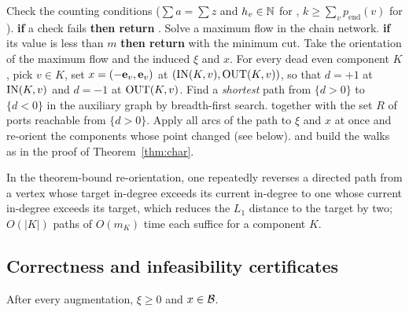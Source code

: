 \begin{algorithm}[t]
\caption{Augmenting path algorithm for \FIX{} and \FREE{}}\label{alg:pf}
\begin{algorithmic}[1]
\State Check the counting conditions ($\sum a=\sum z$ and $h_v\in\mathbb{N}$ for \FIX{}, $k\ge\sum_vp_{\mathrm{end}}(v)$ for \FREE{}). \textbf{if} a check fails \textbf{then return} \NO{}.
\State Solve a maximum flow in the chain network. \textbf{if} its value is less than $m$ \textbf{then return} \NO{} with the minimum cut.
\State Take the orientation of the maximum flow and the induced $\xi$ and $x$. For every dead even component $K$, pick $v\in K$, set $x=(-\mathbf{e}_v,\mathbf{e}_v)$ at $(\mathrm{IN}(K,v),\mathrm{OUT}(K,v))$, so that $d=+1$ at $\mathrm{IN}(K,v)$ and $d=-1$ at $\mathrm{OUT}(K,v)$.
  \State Find a \emph{shortest} path from $\{d>0\}$ to $\{d<0\}$ in the auxiliary graph by breadth-first search.
    \State \Return \NO{} together with the set $R$ of ports reachable from $\{d>0\}$.
  \EndIf
  \State Apply all arcs of the path to $\xi$ and $x$ at once and re-orient the components whose point changed (see below).
\EndWhile
\State \Return \YES{} and build the walks as in the proof of Theorem~\ref{thm:char}.
\end{algorithmic}
\end{algorithm}

In the theorem-bound re-orientation, one repeatedly reverses a directed path from a vertex whose target in-degree exceeds its current in-degree to one whose current in-degree exceeds its target, which reduces the $L_1$ distance to the target by two; $O(|K|)$ paths of $O(m_K)$ time each suffice for a component $K$.

\subsection{Correctness and infeasibility certificates}

\begin{lemma}\label{lem:invariant}
After every augmentation, $\xi\ge0$ and $x\in\mathcal{B}$.
\end{lemma}

